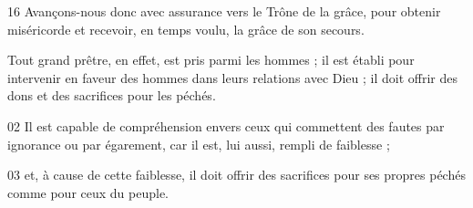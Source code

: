 
16 Avançons-nous donc avec assurance vers le Trône de la grâce, pour obtenir miséricorde et recevoir, en temps voulu, la grâce de son secours.

Tout grand prêtre, en effet, est pris parmi les hommes ; il est établi pour intervenir en faveur des hommes dans leurs relations avec Dieu ; il doit offrir des dons et des sacrifices pour les péchés.

02 Il est capable de compréhension envers ceux qui commettent des fautes par ignorance ou par égarement, car il est, lui aussi, rempli de faiblesse ;

03 et, à cause de cette faiblesse, il doit offrir des sacrifices pour ses propres péchés comme pour ceux du peuple.